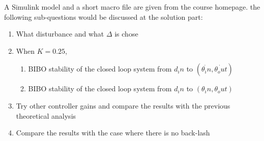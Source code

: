 A Simulink model and a short macro file are given from the course homepage. the following sub-questions would be discussed at the solution part:
\begin{enumerate}
  \item What disturbance and what $\Delta$ is chose
  \item When $K=0.25$,
  \begin{enumerate}
  \item BIBO stability of the closed loop system from $d_in$ to $(\dot{\theta_in},\dot{\theta_out})$ 
  \item BIBO stability of the closed loop system from $d_in$ to $(\theta_in,\theta_out)$
  \end{enumerate}
  \item Try other controller gains and compare the results with the previous theoretical analysis
  \item Compare the results with the case where there is no back-lash
\end{enumerate}